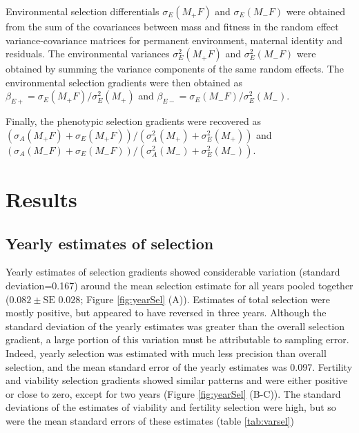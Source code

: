 Environmental selection differentials $\sigma_{E}(M_+F)$ and $\sigma_{E}(M_-F)$ were obtained from the sum of the covariances between mass and fitness in the random effect variance-covariance matrices for permanent environment, maternal identity and residuals. The environmental variances $\sigma_{E}^2(M_+F)$ and $\sigma_{E}^2(M_-F)$ were obtained by summing the variance components of the same random effects. 
The environmental selection gradients were then obtained as $\beta_{E+} = \sigma_{E}(M_+F) /\sigma_{E}^2(M_+)$ and $\beta_{E-} = \sigma_{E}(M_-F) /\sigma_{E}^2(M_-)$.

Finally, the phenotypic selection gradients were recovered as $(\sigma_{A}(M_+F)+\sigma_{E}(M_+F)) /(\sigma_{A}^2(M_+)+\sigma_{E}^2(M_+))$ and $(\sigma_{A}(M_-F)+\sigma_{E}(M_-F)) /(\sigma_{A}^2(M_-)+\sigma_{E}^2(M_-))$.

\section*{Results}

\subsection*{Yearly estimates of selection}

Yearly estimates of selection gradients showed considerable variation (standard deviation=0.167) around the mean selection estimate for all years pooled together ($0.082\pm \text{SE } 0.028$; Figure \ref{fig:yearSel} (A)). Estimates of total selection were mostly positive, but appeared to have reversed in three years. Although the standard deviation of the yearly estimates was greater than the overall selection gradient, a large portion of this variation must be attributable to sampling error. Indeed, yearly selection was estimated with much less precision than overall selection, and the mean standard error of the yearly estimates was 0.097. 
Fertility and viability selection gradients showed similar patterns and were either positive or close to zero, except for two years (Figure \ref{fig:yearSel} (B-C)). The standard deviations of the estimates of viability and fertility selection were high, but so were the mean standard errors of these estimates (table \ref{tab:varsel})



